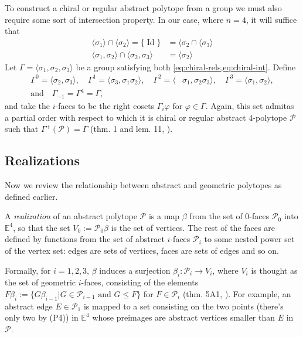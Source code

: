 \documentclass{article}
\theoremstyle{definition}
\newcommand{\E}{\mathbb{E}}
\newcommand{\p}{\mathcal{P}}
\DeclareMathOperator{\Id}{Id}
\begin{document}
	To construct a chiral or regular abstract polytope from a group we must also require some sort of intersection property. In our case, where $n=4$, it will suffice that
		\begin{equation}\label{eq:chiral-int}
		\begin{aligned}
			\langle\sigma_1\rangle\cap\langle\sigma_2\rangle=\{\Id\}&=\langle\sigma_2\cap\langle\sigma_3\rangle\\
			\langle\sigma_1,\sigma_2\rangle\cap\langle\sigma_2,\sigma_3\rangle&=\langle\sigma_2\rangle
		\end{aligned}
	\end{equation}
	Let $\Gamma=\langle \sigma_1,\sigma_2,\sigma_3\rangle$ be a group satisfying both \cref{eq:chiral-rels,eq:chiral-int}. Define
	\begin{align*}
		\Gamma^0=\langle\sigma_2,\sigma_3\rangle,\quad
		\Gamma^1=\langle \sigma_3,\sigma_1\sigma_2\rangle,\quad
		\Gamma^2=\langle &\sigma_1,\sigma_2\sigma_3\rangle,\quad
		\Gamma^3=\langle \sigma_1,\sigma_2\rangle,\\
		\text{and}\quad\Gamma_{-1}=\Gamma^4=\Gamma,
	\end{align*}
	and take the $i$-faces to be the right cosets $\Gamma_i\varphi$ for $\varphi\in\Gamma$. Again, this set admitas a partial order with respect to which it is chiral or regular abstract 4-polytope $\p$ such that $\Gamma^+(\p)=\Gamma$ (thm. 1 and lem. 11, \cite{schulte-chiral}).
	
\fi
	
\vspace{10pt}

	\subsection{Realizations}\label{subsec:realizations}
	Now we review the relationship between abstract and geometric polytopes as defined earlier.
	
	A \textit{realization} of an abstract polytope $\p$ is a map $\beta$ from the set of 0-faces $\p_0$ into $\E^4$, so that the set $V_0:=\p_0\beta$ is the set of vertices. The rest of the faces are defined by functions from the set of abstract $i$-faces $\p_i$ to some nested power set of the vertex set: edges are sets of vertices, faces are sets of edges and so on.
	
	Formally, for $i=1,2,3$, $\beta$ induces a surjection $\beta_i:\p_i\to V_i$, where $V_i$ is thought as the set of geometric $i$-faces, consisting of the elements ${F\beta_i:=\{G\beta_{i-1}|G\in\p_{i-1}\text{ and }G\leq F\}}$ for $F\in\p_i$ (thm. 5A1, \cite{abstract-polytopes}). For example, an abstract edge $E\in\p_1$ is mapped to a set consisting on the two points (there's only two by (P4)) in $\E^4$ whose preimages are abstract vertices smaller than $E$ in $\p$.
\end{document}
